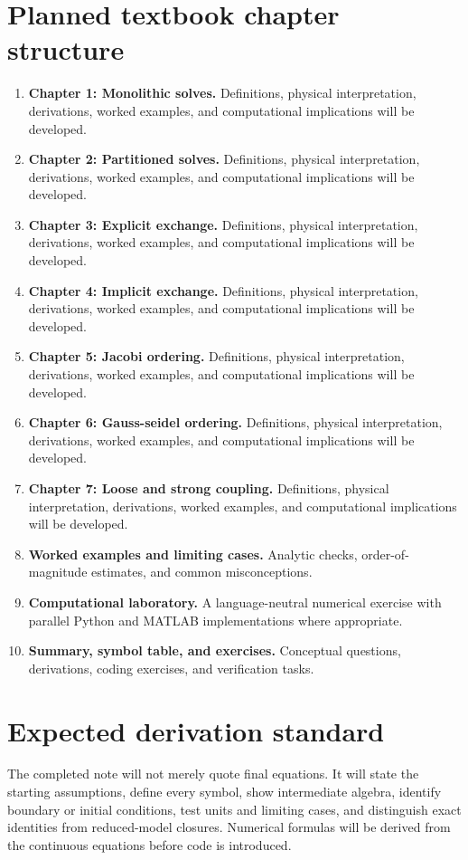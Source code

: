 \documentclass[11pt]{article}
\begin{document}
\section{Planned textbook chapter structure}
\begin{enumerate}[leftmargin=1.8em]
\item \textbf{Chapter 1: Monolithic solves.} Definitions, physical interpretation, derivations, worked examples, and computational implications will be developed.
\item \textbf{Chapter 2: Partitioned solves.} Definitions, physical interpretation, derivations, worked examples, and computational implications will be developed.
\item \textbf{Chapter 3: Explicit exchange.} Definitions, physical interpretation, derivations, worked examples, and computational implications will be developed.
\item \textbf{Chapter 4: Implicit exchange.} Definitions, physical interpretation, derivations, worked examples, and computational implications will be developed.
\item \textbf{Chapter 5: Jacobi ordering.} Definitions, physical interpretation, derivations, worked examples, and computational implications will be developed.
\item \textbf{Chapter 6: Gauss-seidel ordering.} Definitions, physical interpretation, derivations, worked examples, and computational implications will be developed.
\item \textbf{Chapter 7: Loose and strong coupling.} Definitions, physical interpretation, derivations, worked examples, and computational implications will be developed.
\item \textbf{Worked examples and limiting cases.} Analytic checks, order-of-magnitude estimates, and common misconceptions.
\item \textbf{Computational laboratory.} A language-neutral numerical exercise with parallel Python and MATLAB implementations where appropriate.
\item \textbf{Summary, symbol table, and exercises.} Conceptual questions, derivations, coding exercises, and verification tasks.
\end{enumerate}

\section{Expected derivation standard}
The completed note will not merely quote final equations. It will state the starting assumptions, define every symbol, show intermediate algebra, identify boundary or initial conditions, test units and limiting cases, and distinguish exact identities from reduced-model closures. Numerical formulas will be derived from the continuous equations before code is introduced.
\end{document}
